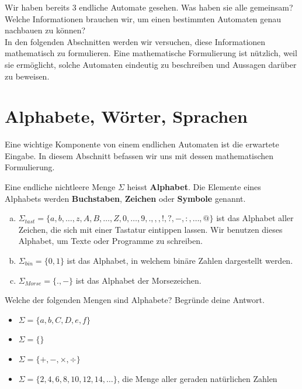 \documentclass{article}
\begin{document}
Wir haben bereits 3 endliche Automate gesehen. Was haben sie alle gemeinsam? Welche Informationen brauchen wir, um einen bestimmten Automaten genau nachbauen zu können?\\


In den folgenden Abschnitten werden wir versuchen, diese Informationen mathematisch zu formulieren. Eine mathematische Formulierung ist nützlich, weil sie ermöglicht, solche Automaten eindeutig zu beschreiben und Aussagen darüber zu beweisen.

\section{Alphabete, Wörter, Sprachen}
Eine wichtige Komponente von einem endlichen Automaten ist die erwartete Eingabe. In diesem Abschnitt befassen wir uns mit dessen mathematischen Formulierung.

\begin{definition}
Eine endliche nichtleere Menge \(\Sigma\) heisst \textbf{Alphabet}. Die Elemente eines Alphabets werden \textbf{Buchstaben}, \textbf{Zeichen} oder \textbf{Symbole} genannt.
\end{definition}

\begin{example}
\begin{enumerate}[(a)]
    \item \(\Sigma_{tast} = \{a, b, \dots, z, A, B, \dots, Z, 0, \dots, 9, ., ,, !, ?, -, :, \dots, @\}\) ist das Alphabet aller Zeichen, die sich mit einer Tastatur eintippen lassen. Wir benutzen dieses Alphabet, um Texte oder Programme zu schreiben.
    \item \(\Sigma_{bin} = \{0, 1\}\) ist das Alphabet, in welchem binäre Zahlen dargestellt werden.
    \item \(\Sigma_{Morse} = \{.,-\}\) ist das Alphabet der Morsezeichen.
\end{enumerate}
\end{example}

\begin{exercise}
Welche der folgenden Mengen sind Alphabete? Begründe deine Antwort.
\begin{itemize}[label=$\square$]
    \item \(\Sigma = \{a, b, C, D, e, f\}\)
    \item \(\Sigma = \{\}\)
    \item \(\Sigma = \{+, -, \times, \div\}\)
    \item \(\Sigma = \{2, 4, 6, 8, 10, 12, 14, \dots\}\), die Menge aller geraden natürlichen Zahlen
\end{itemize}
\end{exercise}
\end{document}
